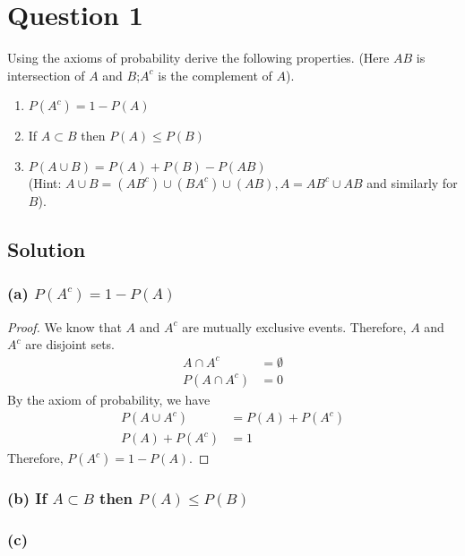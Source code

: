 \section*{Question 1}

Using the axioms of probability derive the following properties.
(Here \(AB\) is intersection of \(A\) and \(B\);\@ \(A^c\) is the complement of \(A\)).

\begin{enumerate}[label = (\alph*)]
    \item \( P(A^c)=1 - P(A) \)
    \item If \( A \subset B \) then \( P(A) \leq P(B) \)
    \item \( P(A\cup B)=P(A)+P(B)-P(AB) \) \\
          (Hint: \( A\cup B = (AB^c)\cup(BA^c)\cup(AB), A = AB^c \cup AB \) and similarly for \( B \)).
\end{enumerate}

\subsection*{Solution}

\subsubsection*{(a) \( P(A^c)=1 - P(A) \)}

\begin{proof}
    We know that \( A \) and \( A^c \) are mutually exclusive events. Therefore, \( A \) and \( A^c \) are disjoint sets.
    \begin{align*}
        A \cap A^c    & = \emptyset \\
        P(A \cap A^c) & = 0
    \end{align*}
    By the axiom of probability, we have
    \begin{align*}
        P(A \cup A^c) & = P(A) + P(A^c) \\
        P(A) + P(A^c) & = 1
    \end{align*}
    Therefore, \( P(A^c) = 1 - P(A) \).
\end{proof}

\subsubsection*{(b) If \( A \subset B \) then \( P(A) \leq P(B) \)}

\subsubsection*{(c)}
